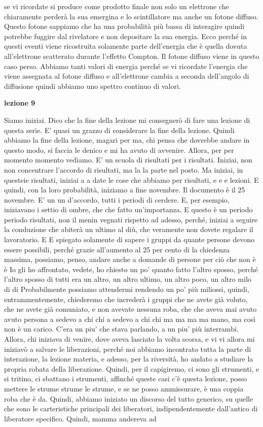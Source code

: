 se vi ricordate si produce come prodotto finale non solo un elettrone che chiaramente perderà la sua emergina e lo scintillatore ma anche un fotone diffuso. Questo fotone sappiamo che ha una probabilità più bassa di interagire quindi potrebbe fuggire dal rivelatore e non depositare la sua energia. Ecco perché in questi eventi viene ricostruita solamente parte dell'energia che è quella dovuta all'elettrone scatterato durante l'effetto Compton. Il fotone diffuso viene in questo caso perso. Abbiamo tanti valori di energia perché se vi ricordate l'energia che viene assegnata al fotone diffuso e all'elettrone cambia a seconda dell'angolo di diffusione quindi abbiamo uno spettro continuo di valori.

\textbf{lezione 9}

Siamo iniziai. Dico che la fine della lezione mi consegnerò di fare una lezione di questa serie. E' quasi un grazzo di considerare la fine della lezione. Quindi abbiamo la fine della lezione, magari per ma, chi pensa che dovrebbe andare in questo modo, si faccia le denico e mi ha avuto di avvenire. Allora, per per momento momento vediamo. E' un scuola di risultati per i risultati. Iniziai, non non concentrare l'accordo di risultati, ma la la parte nel posto. Ma iniziai, in questeie risultati, iniziai a a date le cose che abbiamo per risultati, e e e lezioni. E quindi, con la loro probabilità, iniziamo a fine novembre. Il documento è il 25 novembre. E' un un d'accordo, tutti i periodi di cerdere. E, per esempio, iniziavano i settio di ombre, che che fatto un'importanza. E questo è un periodo periodo risultati, non il menin vegnati rispetto ad adesso, perché, iniziai a seguire la conduzione che abiterà un ultimo al diù, che veramente non dovete regalare il lavoratorio. E E spiegato solamente di sapere i gruppi da quante persone devono essere possibili, perché grazie all'aumento al 25 per cento di la chiedenza massima, possiamo, penso, andare anche a domande di persone per ciò che non è è Io gli ho affrontato, vedete, ho chiesto un po' quanto fatto l'altro sposso, perché l'altro sposso di tutti era un altro, un altro ultimo, un altro poco, un altro milo di di Probabilmente possiamo attendermi rendendo un po' più miliossi, quindi, entrammentemente, chiederemo che increderà i gruppi che ne avete già voluto, che ne avete già comuniato, e non avevate nessuna roba, che che aveva mai avuto avuto persona a sedevo a chi chi a sedevo a chi chi ma ma ma ma mano, ma così non è un carico. C'era un piu' che stava parlando, a un piu' più interrambi. Allora, chi iniziava di venire, dove aveva lasciato la volta scorsa, e vi vi allora mi iniziavò a salvare le liberazioni, perché noi abbiamo incontrato tutta la parte di interazione, la lezione materia, e adesso, per la riversità, ho andato a studiare la propria robata della liberazione. Quindi, per il capigiremo, ci sono gli strumenti, e si tritino, ci sbattano i strumenti, affinché queste casi c'è questa lezione, posso mettere le strume strume le strume, e se ne posso ammissurare, è una coppia roba che è da. Quindi, abbiamo iniziato un discorso del tutto generico, su quelle che sono le carteristiche principali dei liberatori, indipendentemente dall'antico di liberatore specifico. Quindi, mamma andereva ad 